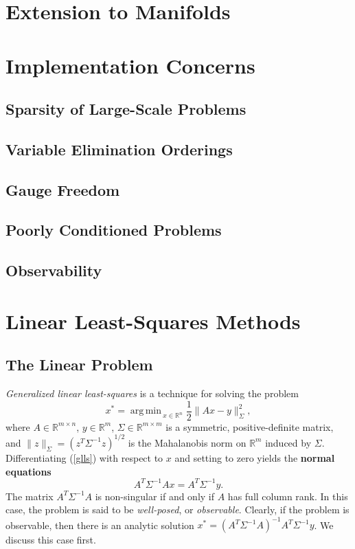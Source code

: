 \documentclass{amsart}
\DeclareMathOperator*{\argmin}{arg\,min\,}
\begin{document}
\section{Extension to Manifolds}

\section{Implementation Concerns}
\subsection{Sparsity of Large-Scale Problems}
\subsection{Variable Elimination Orderings}
\subsection{Gauge Freedom}
\subsection{Poorly Conditioned Problems}
\subsection{Observability}

\appendix

\section{Linear Least-Squares Methods}
\subsection{The Linear Problem}

\emph{Generalized linear least-squares} is a technique for solving the problem
\label{glls}
\begin{equation}
    x^* = \argmin_{x \in \mathbb R^n} \frac12 \| Ax - y\|_\Sigma^2,
\end{equation}
where $A \in \mathbb R^{m \times n}$, $y \in \mathbb R^m$, $\Sigma \in \mathbb R^{m \times m}$
is a symmetric, positive-definite matrix, and $\| z \|_\Sigma = (z^T \Sigma^{-1} z)^{1/2}$ is the
Mahalanobis norm on $\mathbb R^m$ induced by $\Sigma$. Differentiating (\ref{glls}) with respect
to $x$ and setting to zero yields the \textbf{normal equations}
\label{normal}
\begin{equation}
    A^T \Sigma^{-1} A x = A^T \Sigma^{-1} y.
\end{equation}
The matrix $A^T \Sigma^{-1} A$ is non-singular if and only if $A$ has full column rank. In this
case, the problem is said to be \emph{well-posed}, or \emph{observable}.
Clearly, if the problem is observable, then there is an analytic solution
$x^* = (A^T \Sigma^{-1} A)^{-1} A^T \Sigma^{-1} y$. We discuss this case first.
\end{document}
